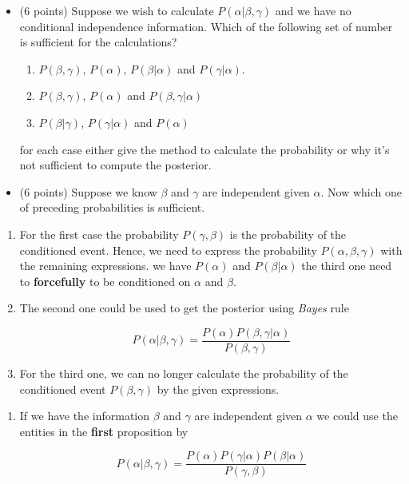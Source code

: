 \documentclass[10pt]{article}
\begin{document}
\begin{itemize}
  \item (6 points)  Suppose we wish to calculate $P(\alpha| \beta, \gamma)$ and
    we have no conditional independence information. Which of the following set
    of number is sufficient for the calculations?
   \begin{enumerate} 
     \item $P(\beta, \gamma)$, $P(\alpha)$, $P(\beta|\alpha)$ and $P(\gamma|\alpha)$.
       \item $P(\beta,\gamma)$, $P(\alpha)$ and $P(\beta, \gamma|\alpha)$
         \item $P(\beta|\gamma)$, $P(\gamma|\alpha)$ and $P(\alpha)$
     \end{enumerate}
     for each case either give the method to calculate the probability or why
     it's not sufficient to compute the posterior.

     \item (6 points) Suppose we know $\beta$ and $\gamma$ are independent given
       $\alpha$. Now which one of preceding probabilities is sufficient.
  \end{itemize}
  
\begin{enumerate}[label=(\alph*)]
\item For the first case the probability $P(\gamma,\beta)$ is the probability of
  the conditioned event. Hence, we need to express the probability
  $P(\alpha,\beta,\gamma)$ with the remaining expressions. we have $P(\alpha)$
  and $P(\beta|\alpha)$ the third one need to \textbf{forcefully } to be
  conditioned on $\alpha$ and $\beta$.\\

  \item The second one could be used to get the posterior using \emph{Bayes}
    rule

    \begin{equation}
      P(\alpha| \beta, \gamma) = \dfrac{P(\alpha) P(\beta,\gamma|\alpha)}{P(\beta,\gamma)}
      \end{equation}

    \item For the third one, we can no longer calculate the probability of the
      conditioned event $P(\beta, \gamma)$ by the given expressions.
  \end{enumerate}
  
\begin{enumerate}[label=(\alph*)]
  \item If we have the information $\beta $ and $\gamma$ are independent given
    $\alpha$ we could use the entities in the \textbf{first} proposition by

    \begin{equation}
     P(\alpha|\beta,\gamma)  = \dfrac{P(\alpha)P(\gamma|\alpha)P(\beta|\alpha)}{P(\gamma, \beta)}
      \end{equation}
  \end{enumerate}
\end{document}
